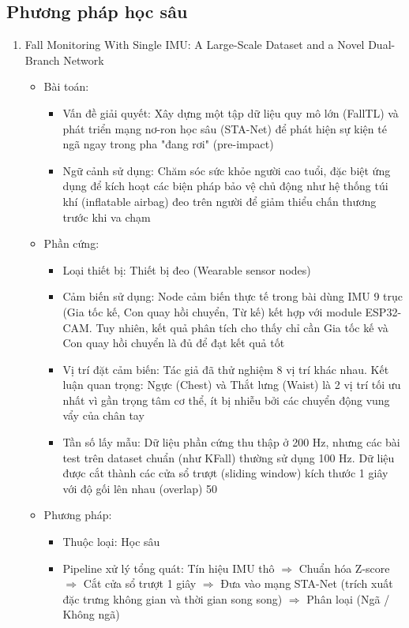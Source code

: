 \documentclass[../DoAn.tex]{subfiles}
\begin{document}
\subsection{Phương pháp học sâu}
\begin{enumerate}[label=\arabic*)]
    \item Fall Monitoring With Single IMU: A Large-Scale Dataset and a Novel Dual-Branch Network
    \begin{itemize}
        \item Bài toán:
        \begin{itemize}
            \item Vấn đề giải quyết: Xây dựng một tập dữ liệu quy mô lớn (FallTL) và phát triển mạng nơ-ron học sâu (STA-Net) để phát hiện sự kiện té ngã ngay trong pha "đang rơi" (pre-impact)
            \item Ngữ cảnh sử dụng: Chăm sóc sức khỏe người cao tuổi, đặc biệt ứng dụng để kích hoạt các biện pháp bảo vệ chủ động như hệ thống túi khí (inflatable airbag) đeo trên người để giảm thiểu chấn thương trước khi va chạm
        \end{itemize}
        \item Phần cứng:
        \begin{itemize}
            \item Loại thiết bị: Thiết bị đeo (Wearable sensor nodes)
            \item Cảm biến sử dụng: Node cảm biến thực tế trong bài dùng IMU 9 trục (Gia tốc kế, Con quay hồi chuyển, Từ kế) kết hợp với module ESP32-CAM. Tuy nhiên, kết quả phân tích cho thấy chỉ cần Gia tốc kế và Con quay hồi chuyển là đủ để đạt kết quả tốt
            \item Vị trí đặt cảm biến: Tác giả đã thử nghiệm 8 vị trí khác nhau. Kết luận quan trọng: Ngực (Chest) và Thắt lưng (Waist) là 2 vị trí tối ưu nhất vì gần trọng tâm cơ thể, ít bị nhiễu bởi các chuyển động vung vẩy của chân tay
            \item Tần số lấy mẫu: Dữ liệu phần cứng thu thập ở 200 Hz, nhưng các bài test trên dataset chuẩn (như KFall) thường sử dụng 100 Hz. Dữ liệu được cắt thành các cửa sổ trượt (sliding window) kích thước 1 giây với độ gối lên nhau (overlap) 50%
        \end{itemize}
        \item Phương pháp:
        \begin{itemize}
            \item Thuộc loại: Học sâu 
            \item Pipeline xử lý tổng quát: Tín hiệu IMU thô $\Longrightarrow$ Chuẩn hóa Z-score $\Longrightarrow$ Cắt cửa sổ trượt 1 giây $\Longrightarrow$ Đưa vào mạng STA-Net (trích xuất đặc trưng không gian và thời gian song song) $\Longrightarrow$ Phân loại (Ngã / Không ngã)

\end{itemize}
\end{itemize}
\end{enumerate}
\end{document}

